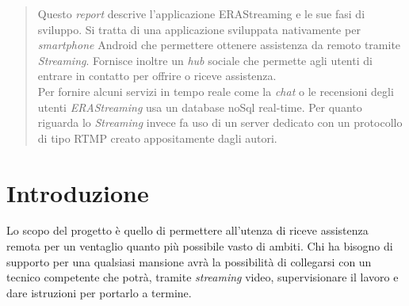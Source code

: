 \documentclass[conference]{IEEEtran}
\begin{document}
\maketitle

\begin{abstract}
Questo \textit{report} descrive l'applicazione ERAStreaming e le sue fasi di sviluppo. Si tratta di una applicazione 
sviluppata nativamente per \textit{smartphone} Android che permettere ottenere assistenza da 
remoto tramite \textit{Streaming}. Fornisce inoltre un \textit{hub} sociale che permette agli utenti
di entrare in contatto per offrire o riceve assistenza.\\Per fornire alcuni servizi in tempo reale
come la \textit{chat} o le recensioni degli utenti \textit{ERAStreaming} usa un database noSql real-time.
Per quanto riguarda lo \textit{Streaming} invece fa uso di un server dedicato con un protocollo di tipo
RTMP creato appositamente dagli autori.
\end{abstract}





%
\IEEEpeerreviewmaketitle



\section{Introduzione}
	Lo scopo del progetto è quello di permettere all'utenza di riceve assistenza
	remota per un ventaglio quanto più possibile vasto di ambiti.
	Chi ha bisogno di supporto per una qualsiasi mansione avrà la possibilità
	di collegarsi con un tecnico competente che potrà, tramite \textit{streaming} video,
	supervisionare il lavoro e dare istruzioni per portarlo a termine.
\end{document}
